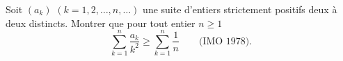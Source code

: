 Soit $(a_k)$ $(k = 1, 2, \ldots, n, \ldots)$ une suite d'entiers strictement positifs deux à deux distincts. Montrer que pour tout entier $n \geq 1$
\[ \sum_{k=1}^n \frac{a_k}{k^2} \geq \sum_{k=1}^n \frac{1}{n} \qquad \text{(IMO 1978).} \]
